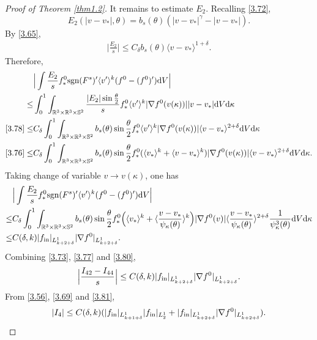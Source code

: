 \documentclass[reqno,10pt]{amsart}
\def\grad{\nabla}
\def\th{\theta}
\newcommand{\beq}{\begin{equation}}
\newcommand{\eeq}{\end{equation}}
\newcommand{\ben}{\begin{eqnarray}}
\newcommand{\een}{\end{eqnarray}}
\theoremstyle{definition}
\numberwithin{equation}{section}
\begin{document}
\begin{proof}[Proof of Theorem \ref{thm1.2}]
It remains to estimate $E_2$.
Recalling \eqref{3.72},
$$E_2(|v-v_*|,\th)=b_s(\th)(|v-v_*|^\gamma-|v-v_*|).$$
By \eqref{3.65},
\ben\label{3.78}
\Big|\frac{E_2}{s}\Big|\le C_\delta b_s(\th)\langle v-v_*\rangle^{1+\delta}.
\een
Therefore,
$$
\begin{aligned}
    &\Big|\int\frac{E_2}{s}f^0_*\textup{sgn}(F^s)'\langle v'\rangle^k(f^0-(f^0)')\mathrm{d}V\Big|\\
    \le &
    \int_0^1\int_{\mathbb{R}^3\times\mathbb{R}^3\times\mathbb{S}^2}\frac{|E_2|\sin\frac{\th}{2}}{s}f^0_*\langle v'\rangle^k|\grad f^0(v(\kappa))||v-v_*|\mathrm{d}V\mathrm{d}\kappa\\
    \eqref{3.78}\le & 
    C_\delta\int_0^1\int_{\mathbb{R}^3\times\mathbb{R}^3\times\mathbb{S}^2}b_s(\th)\sin\frac{\th}{2}f^0_*\langle v'\rangle^k|\grad f^0(v(\kappa))|\langle v-v_*\rangle^{2+\delta}\mathrm{d}V\mathrm{d}\kappa\\
    \eqref{3.76}\le &
    C_\delta\int_0^1\int_{\mathbb{R}^3\times\mathbb{R}^3\times\mathbb{S}^2}b_s(\th)\sin\frac{\th}{2}f^0_*(\langle v_*\rangle^k+\langle v-v_*\rangle^k)|\grad f^0(v(\kappa))|\langle v-v_*\rangle^{2+\delta}\mathrm{d}V\mathrm{d}\kappa.
\end{aligned}
$$
Taking change of variable $v\to v(\kappa)$, one has
\beq\label{3.80}
\begin{aligned}
    &\Big|\int\frac{E_2}{s}f^0_*\textup{sgn}(F^s)'\langle v'\rangle^k(f^0-(f^0)')\mathrm{d}V\Big|\\
     \le & C_\delta\int_0^1\int_{\mathbb{R}^3\times\mathbb{R}^3\times\mathbb{S}^2}b_s(\th)\sin\frac{\th}{2}f^0_*\Big(\langle v_*\rangle^k+\langle \frac{v-v_*}{\psi_\kappa(\th)}\rangle^k\Big)|\grad f^0(v)|\langle \frac{v-v_*}{\psi_\kappa(\th)}\rangle^{2+\delta}\frac{1}{\psi^3_\kappa(\th)}\mathrm{d}V\mathrm{d}\kappa\\
    \le &
    C(\delta,k)|f_{\textup{in}}|_{L^1_{k+2+\delta}}|\grad f^0|_{L^1_{k+2+\delta}}.
\end{aligned}
\eeq
Combining \eqref{3.73}, \eqref{3.77} and \eqref{3.80},
\ben\label{3.81}
\Big|\frac{I_{42}-I_{44}}{s}\Big|\le C(\delta,k)|f_{\textup{in}}|_{L^1_{k+2+\delta}}|\grad f^0|_{L^1_{k+2+\delta}}.
\een
From \eqref{3.56}, \eqref{3.69} and \eqref{3.81},
\ben\label{3.82}
|I_4|\le C(\delta,k)(|f_{\textup{in}}|_{L^1_{k+1+\delta}}|f_{\textup{in}}|_{L^1_{2}}+|f_{\textup{in}}|_{L^1_{k+2+\delta}}|\grad f^0|_{L^1_{k+2+\delta}}).
\een


\end{proof}
\end{document}
